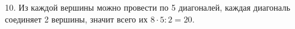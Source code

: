 10. Из каждой вершины можно провести по 5 диагоналей, каждая диагональ соединяет 2 вершины, значит всего их $8\cdot5:2=20.$\\
